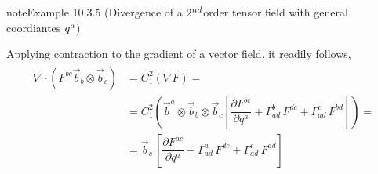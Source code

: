 \documentclass[letterpaper,10pt,english]{jupyterBook}
\begin{document}
\begin{sphinxadmonition}{note}{Example 10.3.5 (Divergence of a \protect\(2^{nd}\protect\)\sphinxhyphen{}order tensor field \sphinxhyphen{} with general coordiantes \protect\(q^{a}\protect\))}



\sphinxAtStartPar
Applying contraction to the gradient of a vector field, it readily follows,
\begin{equation*}
\begin{split}\begin{aligned}
  \nabla \cdot \left( F^{bc} \vec{b}_b \otimes \vec{b}_c \right)
  & = C_{1}^{2} \left( \nabla F \right) = \\
  & = C_1^2 \left( \vec{b}^a \otimes \vec{b}_b \otimes \vec{b}_c \left[ \dfrac{\partial F^{bc}}{\partial q^a} + \Gamma_{ad}^b \, F^{dc} + \Gamma^{c}_{ad} \, F^{bd}  \right]  \right) = \\
  & = \vec{b}_c \, \left[ \dfrac{\partial F^{ac}}{\partial q^a} + \Gamma_{ad}^a \, F^{dc} + \Gamma^{c}_{ad} \, F^{ad}  \right] 
\end{aligned}\end{split}
\end{equation*}\end{sphinxadmonition}
\end{document}
